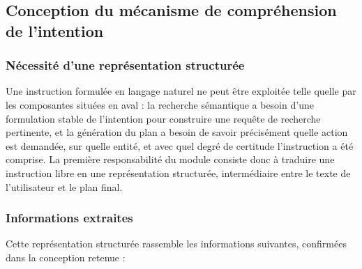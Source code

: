 \subsection{Conception du mécanisme de compréhension de l'intention}
\label{ssec:comprehension-intention}

\subsubsection{Nécessité d'une représentation structurée}

Une instruction formulée en langage naturel ne peut être exploitée telle quelle par les composantes situées en aval : la recherche sémantique a besoin d'une formulation stable de l'intention pour construire une requête de recherche pertinente, et la génération du plan a besoin de savoir précisément quelle action est demandée, sur quelle entité, et avec quel degré de certitude l'instruction a été comprise. La première responsabilité du module consiste donc à traduire une instruction libre en une représentation structurée, intermédiaire entre le texte de l'utilisateur et le plan final.

\subsubsection{Informations extraites}

Cette représentation structurée rassemble les informations suivantes, confirmées dans la conception retenue :


